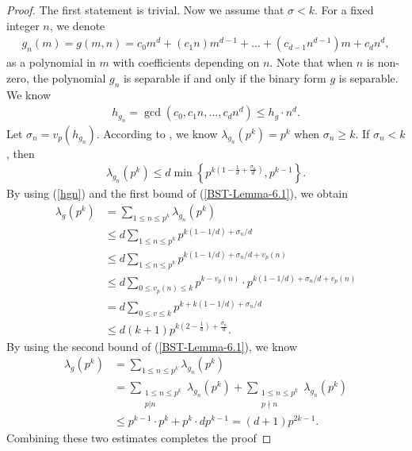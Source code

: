 \documentclass[reqno, 11pt]{amsart}
\renewcommand{\leq}{\leqslant}
\renewcommand{\geq}{\geqslant}
\theoremstyle{definition}
\theoremstyle{definition}
\renewcommand{\geq}{\geqslant}
\renewcommand{\leq}{\leqslant}
\numberwithin{equation}{section}
\begin{document}
\begin{proof}
    The first statement is trivial. Now we assume that $\sigma < k$. 
    For a fixed integer $n$, we denote
    \begin{align}\label{gnm}
    	g_n(m) = g(m, n) = c_0m^d + (c_1n)m^{d-1} + \dots + (c_{d-1}n^{d-1})m + c_d n^d,
    \end{align}
    as a polynomial in $m$ with coefficients depending on $n$. Note that when $n$ is non-zero, the polynomial $g_n$ is separable if and only if the binary form $g$ is separable.
	We know
	\begin{align}\label{hgn}
		h_{g_n} = \gcd(c_0, c_1n, \dots, c_dn^d) \leq h_g \cdot n^d.
	\end{align}
	Let $\sigma_n = v_p(h_{g_n})$. According to \cite[Lemma 6.1]{BST}, we know $\lambda_{g_n}(p^k) = p^k$ when $\sigma_n \geq k$. If $\sigma_n < k$, then
	\begin{align}\label{BST-Lemma-6.1}
		\lambda_{g_n}(p^k) \leq d \min \left\{ p^{k(1 - \frac{1}{d} + \frac{\sigma_n}{d})}, p^{k-1} \right\}.
	\end{align}
	By using (\ref{hgn}) and the first bound of (\ref{BST-Lemma-6.1}), we obtain
	\begin{align*}
		\lambda_g(p^k) & = \sum_{1 \leq n \leq p^k} \lambda_{g_n}(p^k) \\
		& \leq d\sum_{1 \leq n \leq p^k} p^{k(1-1/d) + \sigma_n/d} \\
		& \leq d\sum_{1 \leq n \leq p^k} p^{k(1-1/d) + \sigma_n/d + v_p(n)} \\
		& \leq d \sum_{0 \leq v_p(n) \leq k} p^{k-v_p(n)} \cdot p^{k(1 - 1/d) + \sigma_n/d + v_p(n)} \\
		& = d \sum_{0 \leq v \leq k} p^{k + k(1 - 1/d) + \sigma_n/d} \\
		& \leq d(k+1) p^{k(2 - \frac{1}{d}) + \frac{\sigma_n}{d}}.
	\end{align*}
	By using the second bound of (\ref{BST-Lemma-6.1}), we know
	\begin{align*}
		\lambda_g(p^k) & = \sum_{1 \leq n \leq p^k} \lambda_{g_n}(p^k) \\
		& = \sum_{\substack{1 \leq n \leq p^k \\ p | n}} \lambda_{g_n}(p^k) + \sum_{\substack{1 \leq n \leq p^k \\ p \nmid n}} \lambda_{g_n}(p^k) \\
		& \leq p^{k-1} \cdot p^{k} + p^k \cdot d p^{k-1} = (d+1)p^{2k-1}.
	\end{align*}
	Combining these two estimates completes the proof
\end{proof}
\end{document}

